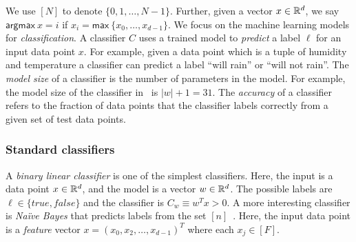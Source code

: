 We use $[N]$ to denote $\{0,1,\dotsc, N-1\}$. Further, given a vector $x\in{\mathbb{R}}^d$, we say $\mathsf{argmax}\ x = i$ if $x_i = \mathsf{max}\ \{x_0,\ldots,x_{d-1}\}$. We focus on the machine learning models for {\it classification}. A classifier $C$ uses a trained model to {\it predict} a
label $\ell$ for an input data point $x$. For example, given a
data point which is a tuple of humidity and temperature 
a classifier can predict a label ``will rain'' or ``will not rain''.
The {\it model size} of a classifier is the number of parameters in the model.
For example, the model size of the classifier in~ is $|w|+1=31$.
The {\it
  accuracy} of a classifier refers to the fraction of data points that
the classifier labels correctly from a given set of test data
points.

\subsubsection*{Standard classifiers}
A {\em binary linear classifier} is one of the simplest classifiers. Here,
the input is a data point $x\in{\mathbb{R}}^d$,
and the model is a vector $w\in{\mathbb{R}}^d$.
 The possible labels are
$\ell\in\{\mathit{true},\mathit{false}\}$ and the classifier is
$C_w\equiv w^Tx>0$.
%
A more interesting classifier is {\em Na\"{i}ve Bayes} that predicts labels
from the set $[n]$~\cite{shafindss}.
Here, the input data point is a {\it feature}
vector $x=(x_0,x_2,\ldots,x_{d-1})^T$ where each $x_j\in [F]$.
